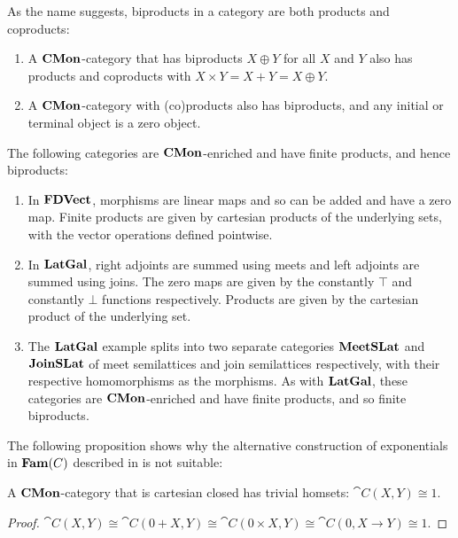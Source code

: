 As the name suggests, biproducts in a category are both products and
coproducts:
\begin{proposition}
  \item
  \begin{enumerate}
  \item A $\mathbf{CMon}$-category that has biproducts $X \oplus Y$ for all
    $X$ and $Y$ also has products and coproducts with
    $X \times Y = X + Y = X \oplus Y$.
  \item A $\mathbf{CMon}$-category with (co)products also has biproducts, and
    any initial or terminal object is a zero object.
  \end{enumerate}
\end{proposition}

\begin{example}
  The following categories are $\mathbf{CMon}$-enriched and have finite
  products, and hence biproducts:
  \begin{enumerate}
  \item In $\mathbf{FDVect}$, morphisms are linear maps and so can be added
    and have a zero map. Finite products are given by cartesian
    products of the underlying sets, with the vector operations
    defined pointwise.
  \item In $\mathbf{LatGal}$, right adjoints are summed using meets and left
    adjoints are summed using joins. The zero maps are given by the
    constantly $\top$ and constantly $\bot$ functions
    respectively. Products are given by the cartesian product of the
    underlying set.
  \item The $\mathbf{LatGal}$ example splits into two separate categories
    $\mathbf{MeetSLat}$ and $\mathbf{JoinSLat}$ of meet semilattices and join
    semilattices respectively, with their respective homomorphisms as
    the morphisms. As with $\mathbf{LatGal}$, these categories are
    $\mathbf{CMon}$-enriched and have finite products, and so finite
    biproducts.
  \end{enumerate}
\end{example}

The following proposition shows why the alternative construction of
exponentials in $\mathbf{Fam}(C)$ described in 
is not suitable:
\begin{proposition}
  A $\mathbf{CMon}$-category that is cartesian closed has trivial homsets:
  $\cat{C}(X,Y) \cong 1$.
\end{proposition}

\begin{proof}
  $\cat{C}(X, Y) \cong \cat{C}(0 + X,Y) \cong \cat{C}(0 \times X,Y)
  \cong \cat{C}(0,X \to Y) \cong 1$.
\end{proof}


